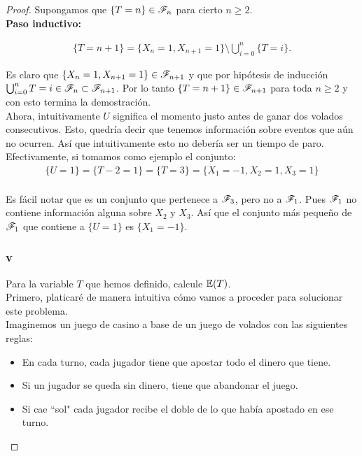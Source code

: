 \begin{proof}
				Supongamos que $\{T = n\} \in \mathscr{F}_n$ para cierto $n \geq 2$.\\
				
			\textbf{Paso inductivo:}
				
				\begin{align}
					\{T = n + 1 \} = \{ X_n = 1, X_{n+1} = 1\} \setminus \bigcup_{i=0}^{n} \{T = i\}.
				\end{align}				
			
				Es claro que $\{ X_n = 1, X_{n+1} = 1\} \in \mathscr{F}_{n + 1}$ y que por hipótesis de inducción
				$\bigcup_{i=0}^{n} {T = i} \in \mathscr{F}_n \subset \mathscr{F}_{n + 1}$. Por lo tanto
				$\{T = n + 1 \} \in \mathscr{F}_{n+1}$ para toda $n \geq 2$ y con esto termina la demostración.\\
				
			Ahora, intuitivamente $U$ significa el momento justo antes de ganar dos volados consecutivos.
			Esto, quedría decir que tenemos información sobre eventos que aún no ocurren. Así que intuitivamente
			esto no debería ser un tiempo de paro.\\
			
			Efectivamente, si tomamos como ejemplo el conjunto: 
				\begin{align}
					\{ U = 1 \} = \{ T - 2 = 1\} = \{ T = 3\} = \{X_1 = -1, X_2 = 1, X_3 = 1\}
				\end{align}		\\
					
			Es fácil notar que es un conjunto que pertenece a $\mathscr{F}_3$, pero no a $\mathscr{F}_1$. Pues $\mathscr{F}_1$
			no contiene información alguna sobre $X_2$ y $X_3$. Así que el conjunto más pequeño de $\mathscr{F}_1$ 
			que contiene a $\{ U = 1 \}$ es $\{ X_1 = -1 \}$.\\
		
		\subsubsection{v}	
		Para la variable $T$ que hemos definido, calcule $\mathbb{E}\! \left( T \right)$.\\
		
		   	Primero, platicaré de manera intuitiva cómo vamos a proceder para solucionar este problema.\\
		
		   	Imaginemos un juego de casino a base de un juego de volados con las siguientes reglas:\\
		   	\begin{itemize}
		   			\item En cada turno, cada jugador tiene que apostar todo el dinero que tiene.
		   			\item Si un jugador se queda sin dinero, tiene que abandonar el juego.
		   			\item Si cae ``sol" cada jugador recibe el doble de lo que había apostado en ese turno.  
		   	\end{itemize}
		   

\end{proof}
